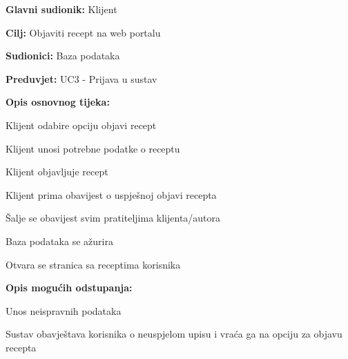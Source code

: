 					\noindent {}
					\begin{packed_item}
	
						\item \textbf{Glavni sudionik: } Klijent
						\item  \textbf{Cilj:} Objaviti recept na web portalu
						\item  \textbf{Sudionici:} Baza podataka
						\item  \textbf{Preduvjet:} UC3 - Prijava u sustav
						\item  \textbf{Opis osnovnog tijeka:}
						
						\item[] \begin{packed_enum}
	
							\item Klijent odabire opciju objavi recept
							\item Klijent unosi potrebne podatke o receptu
							\item Klijent objavljuje recept
							\item Klijent prima obavijest o uspješnoj objavi recepta
							\item Šalje se obavijest svim pratiteljima klijenta/autora
							\item Baza podataka se ažurira
							\item Otvara se stranica sa receptima korisnika
						\end{packed_enum}

						\item  \textbf{Opis mogućih odstupanja:}
						
						\item[] \begin{packed_item}
	
							\item[2.a] Unos neispravnih podataka
							\item[] \begin{packed_enum}
								
								\item Sustav obavještava korisnika o neuspjelom upisu i vraća ga
								na opciju za objavu recepta
								
							\end{packed_enum}
						\end{packed_item}
					\end{packed_item}

